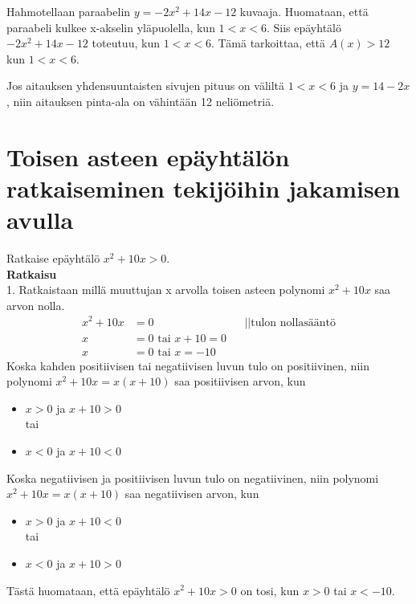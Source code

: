 \begin{esimerkki}
Hahmotellaan paraabelin $y=-2x^2+14x-12$ kuvaaja. Huomataan, että paraabeli kulkee x-akselin yläpuolella, kun $1<x<6$. 
Siis epäyhtälö $-2x^2+14x-12$ toteutuu, kun $1<x<6$. Tämä tarkoittaa, että $A(x)>12$ kun $1<x<6$.

Jos aitauksen yhdensuuntaisten sivujen pituus on väliltä $1<x<6$ ja $y=14-2x$, niin aitauksen pinta-ala on vähintään 12 neliömetriä.
\end{esimerkki}
\section{Toisen asteen epäyhtälön ratkaiseminen tekijöihin jakamisen avulla}
\begin{esimerkki} 
Ratkaise epäyhtälö $x^2+10x>0$. \\
\textbf{Ratkaisu} \\
1. Ratkaistaan millä muuttujan x arvolla toisen asteen polynomi $x^2+10x$ saa arvon nolla. 
\begin{align*}
x^2+10x&=0 \ \ \ \ &&||\text{tulon nollasääntö} \\
x&=0 \text{ tai } x+10=0 \\
x&=0 \text{ tai } x=-10
\end{align*}
Koska kahden positiivisen tai negatiivisen luvun tulo on positiivinen, niin
polynomi $x^2+10x=x(x+10)$ saa positiivisen arvon, kun 
\begin{itemize}
\item{$x>0$ ja $x+10>0$} \\tai \\
\item{$x<0$ ja $x+10<0$} 
\end{itemize}
Koska negatiivisen ja positiivisen luvun tulo on negatiivinen, niin
polynomi $x^2+10x=x(x+10)$ saa negatiivisen arvon, kun
\begin{itemize}
\item{$x>0$ ja $x+10<0$} \\ tai \\
\item{$x<0$ ja $x+10>0$} \\
\end{itemize}
Tästä huomataan, että epäyhtälö $x^2+10x>0$ on tosi, kun $x>0$ tai $x<-10$. 
\end{esimerkki} 

